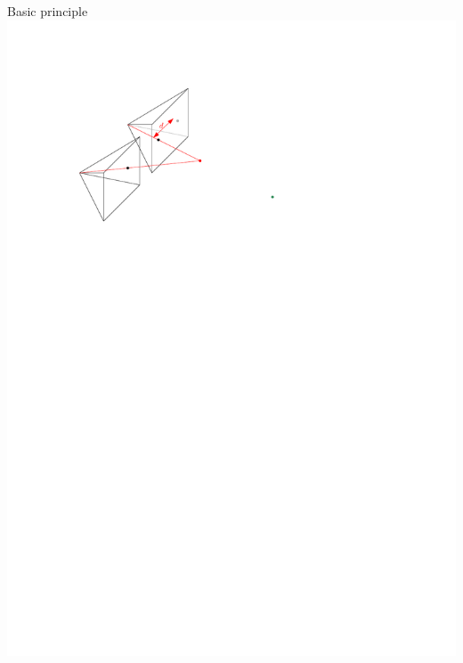 \documentclass{beamer}
\begin{document}
\begin{frame}{Basic principle}
    \includegraphics[width=\textwidth]{images/stereo_1.pdf}
\end{frame}
\end{document}
